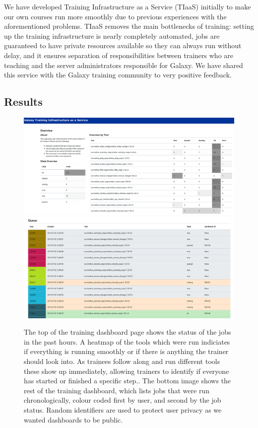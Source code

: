 \documentclass[a4paper,num-refs]{oup-contemporary}
\begin{document}
We have developed Training Infrastructure as a Service (TIaaS) initially to make our own courses run more smoothly due to previous experiences with the aforementioned problems. TIaaS removes the main bottlenecks of training: setting up the training infrastructure is nearly completely automated, jobs are guaranteed to have private resources available so they can always run without delay, and it ensures separation of responsibilities between trainers who are teaching and the server administrators responsible for Galaxy. We have shared this service with the Galaxy training community to very positive feedback.

\subsection{Results}
\begin{figure}[bt!]
\centering
\includegraphics[width=\linewidth]{images/dashboard.png}
\includegraphics[width=\linewidth]{images/queue.png}
\caption{The top of the training dashboard page shows the status of the jobs in the past hours. A heatmap of the tools which were run indiciates if everything is running smoothly or if there is anything the trainer should look into. As trainees follow along and run different tools these show up immediately, allowing trainers to identify if everyone has started or finished a specific step.. The bottom image shows the rest of the training dashboard, which lists jobs that were run chronologically, colour coded first by user, and second by the job status. Random identifiers are used to protect user privacy as we wanted dashboards to be public.}\label{figure:dashboard}
\end{figure}
\end{document}
